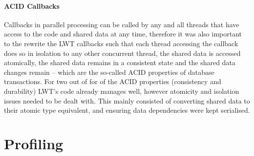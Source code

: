 \documentclass[12pt,twoside,notitlepage]{report}
\begin{document}
%
%
\paragraph{ACID Callbacks}
\label{para:acid_callbacks}
Callbacks in parallel processing can be called by any and all threads that have access to the code and shared data at any time, therefore it was also important to the rewrite the LWT callbacks such that each thread accessing the
callback does so in isolation to any other concurrent thread, the shared data is accessed atomically, the shared data remains in a consistent state and the shared data changes remain -- which are the so-called ACID properties of
database transactions. For two out of for of the ACID properties (consistency and durability) LWT's code already manages well, however atomicity and isolation issues needed to be dealt with. This mainly consisted of converting shared
data to their atomic type equivalent, and ensuring data dependencies were kept serialised.

\section{Profiling}
\label{sec:profiling}
%
%

%
%

%
%
\end{document}
